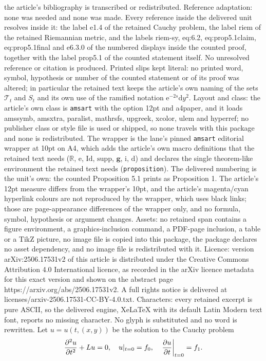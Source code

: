 \documentclass[10pt,a4paper]{amsart}
\newcommand{\R}{\mathbb{R}}
\newcommand{\e}{\mathrm{e}}
\newcommand{\Id}{\mathrm{Id}}
\newcommand{\supp}{\mathrm{supp}}
\newcommand{\g}{\mathbf{g}}
\renewcommand{\i}{\mathrm{i}}
\renewcommand{\d}{\mathrm{d}}
\begin{document}
the article's bibliography is transcribed or redistributed. Reference adaptation: none was needed and none was made. Every reference inside the delivered unit resolves inside it: the label e1.4 of the retained Cauchy problem, the label riem of the retained Riemannian metric, and the labels riem-sy, eq:6.2, eq:prop5.1claim, eq:prop5.1final and e6.3.0 of the numbered displays inside the counted proof, together with the label prop5.1 of the counted statement itself. No unresolved reference or citation is produced. Printed slips kept literal: no printed word, symbol, hypothesis or number of the counted statement or of its proof was altered; in particular the retained text keeps the article's own naming of the sets $\mathcal T_t$ and $S_t$ and its own use of the ramified notation $\e^{-2s}\d y^2$. Layout and class: the article's own class is \texttt{amsart} with the option 12pt and a4paper, and it loads amssymb, amsxtra, paralist, mathrsfs, upgreek, xcolor, ulem and hyperref; no publisher class or style file is used or shipped, so none travels with this package and none is redistributed. The wrapper is the lane's pinned \texttt{amsart} editorial wrapper at 10pt on A4, which adds the article's own macro definitions that the retained text needs ($\R$, $\e$, $\Id$, $\supp$, $\g$, $\i$, $\d$) and declares the single theorem-like environment the retained text needs (\texttt{proposition}). The delivered numbering is the unit's own: the counted Proposition 5.1 prints as Proposition 1. The article's 12pt measure differs from the wrapper's 10pt, and the article's magenta/cyan hyperlink colours are not reproduced by the wrapper, which uses black links; those are page-appearance differences of the wrapper only, and no formula, symbol, hypothesis or argument changes. Assets: no retained span contains a figure environment, a graphics-inclusion command, a PDF-page inclusion, a table or a TikZ picture, no image file is copied into this package, the package declares no asset dependency, and no image file is redistributed with it. Licence: version arXiv:2506.17531v2 of this article is distributed under the Creative Commons Attribution 4.0 International licence, as recorded in the arXiv licence metadata for this exact version and shown on the abstract page https://arxiv.org/abs/2506.17531v2. A full rights notice is delivered at licenses/arxiv-2506.17531-CC-BY-4.0.txt. Characters: every retained excerpt is pure ASCII, so the delivered engine, XeLaTeX with its default Latin Modern text font, reports no missing character. No glyph is substituted and no word is rewritten.
Let $u=u(t,(x,y))$ be the solution to the Cauchy problem
\begin{align}\label{e1.4}
{\partial^2u\over\partial t^2}+Lu=0,\quad u|_{t=0}=f_0,\quad \left.{\partial u\over\partial t}\right|_{t=0}=f_1.
\end{align}
\end{document}
